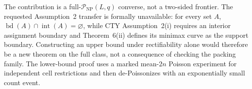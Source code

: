 The contribution is a full-\(\mathcal P_{\mathrm{NP}}(L,q)\) converse, not a two-sided frontier.  The requested Assumption~2 transfer is formally unavailable: for every set \(A\), \(\operatorname{bd}(A)\cap\operatorname{int}(A)=\varnothing\), while CTY Assumption~2(i) requires an interior assignment boundary and Theorem~6(ii) defines its minimax curve as the support boundary.  Constructing an upper bound under rectifiability alone would therefore be a new theorem on the full class, not a consequence of checking the packing family.  The lower-bound proof uses a marked mean-\(2n\) Poisson experiment for independent cell restrictions and then de-Poissonizes with an exponentially small count event.